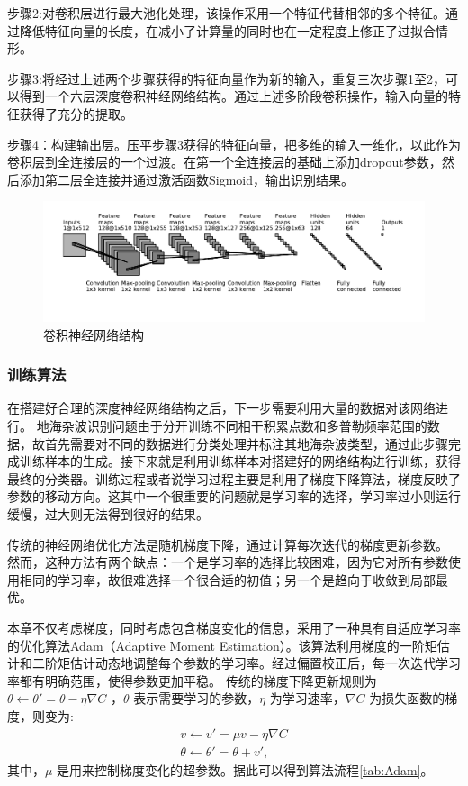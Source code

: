 步骤2:对卷积层进行最大池化处理，该操作采用一个特征代替相邻的多个特征。通过降低特征向量的长度，在减小了计算量的同时也在一定程度上修正了过拟合情形。

步骤3:将经过上述两个步骤获得的特征向量作为新的输入，重复三次步骤1至2，可以得到一个六层深度卷积神经网络结构。通过上述多阶段卷积操作，输入向量的特征获得了充分的提取。

步骤4：构建输出层。压平步骤3获得的特征向量，把多维的输入一维化，以此作为卷积层到全连接层的一个过渡。在第一个全连接层的基础上添加dropout参数，然后添加第二层全连接并通过激活函数Sigmoid，输出识别结果。

\begin{figure}[hbt]
	\centering
	\includegraphics[width=\textwidth]{figures/othr/struct}
	\caption{卷积神经网络结构}
	\label{fig:struct}
\end{figure}

\subsubsection{训练算法}
在搭建好合理的深度神经网络结构之后，下一步需要利用大量的数据对该网络进行。
地海杂波识别问题由于分开训练不同相干积累点数和多普勒频率范围的数据，故首先需要对不同的数据进行分类处理并标注其地海杂波类型，通过此步骤完成训练样本的生成。接下来就是利用训练样本对搭建好的网络结构进行训练，获得最终的分类器。训练过程或者说学习过程主要是利用了梯度下降算法，梯度反映了参数的移动方向。这其中一个很重要的问题就是学习率的选择，学习率过小则运行缓慢，过大则无法得到很好的结果。

传统的神经网络优化方法是随机梯度下降，通过计算每次迭代的梯度更新参数。
然而，这种方法有两个缺点：一个是学习率的选择比较困难，因为它对所有参数使用相同的学习率，故很难选择一个很合适的初值；另一个是趋向于收敛到局部最优。

本章不仅考虑梯度，同时考虑包含梯度变化的信息，采用了一种具有自适应学习率的优化算法Adam（Adaptive Moment Estimation）。该算法利用梯度的一阶矩估计和二阶矩估计动态地调整每个参数的学习率。经过偏置校正后，每一次迭代学习率都有明确范围，使得参数更加平稳。
传统的梯度下降更新规则为$\theta \leftarrow \theta'=\theta-\eta\nabla C$ ，$\theta$ 表示需要学习的参数，$\eta$ 为学习速率，$\nabla C$ 为损失函数的梯度，则变为:
\begin{align}
	v\leftarrow v'=\mu v - \eta \nabla C \\
	\theta \leftarrow \theta' = \theta +v',
\end{align}
其中，$\mu$ 是用来控制梯度变化的超参数。据此可以得到算法流程\ref{tab:Adam}。


